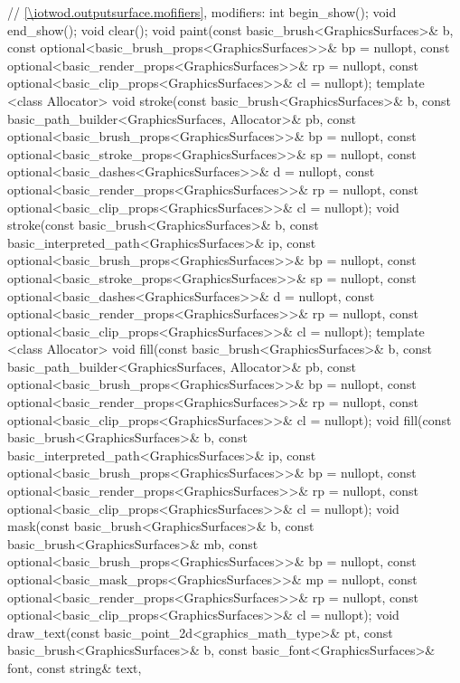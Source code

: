 \begin{codeblock}
{{    // \ref{\iotwod.outputsurface.mofifiers}, modifiers:
    int begin_show();
    void end_show();
    void clear();
    void paint(const basic_brush<GraphicsSurfaces>& b,
      const optional<basic_brush_props<GraphicsSurfaces>>& bp = nullopt,
      const optional<basic_render_props<GraphicsSurfaces>>& rp = nullopt,
      const optional<basic_clip_props<GraphicsSurfaces>>& cl = nullopt);
    template <class Allocator>
    void stroke(const basic_brush<GraphicsSurfaces>& b,
      const basic_path_builder<GraphicsSurfaces, Allocator>& pb,
      const optional<basic_brush_props<GraphicsSurfaces>>& bp = nullopt,
      const optional<basic_stroke_props<GraphicsSurfaces>>& sp = nullopt,
      const optional<basic_dashes<GraphicsSurfaces>>& d = nullopt,
      const optional<basic_render_props<GraphicsSurfaces>>& rp = nullopt,
      const optional<basic_clip_props<GraphicsSurfaces>>& cl = nullopt);
    void stroke(const basic_brush<GraphicsSurfaces>& b,
      const basic_interpreted_path<GraphicsSurfaces>& ip,
      const optional<basic_brush_props<GraphicsSurfaces>>& bp = nullopt,
      const optional<basic_stroke_props<GraphicsSurfaces>>& sp = nullopt,
      const optional<basic_dashes<GraphicsSurfaces>>& d = nullopt,
      const optional<basic_render_props<GraphicsSurfaces>>& rp = nullopt,
      const optional<basic_clip_props<GraphicsSurfaces>>& cl = nullopt);
    template <class Allocator>
    void fill(const basic_brush<GraphicsSurfaces>& b,
      const basic_path_builder<GraphicsSurfaces, Allocator>& pb,
      const optional<basic_brush_props<GraphicsSurfaces>>& bp = nullopt,
      const optional<basic_render_props<GraphicsSurfaces>>& rp = nullopt,
      const optional<basic_clip_props<GraphicsSurfaces>>& cl = nullopt);
    void fill(const basic_brush<GraphicsSurfaces>& b,
      const basic_interpreted_path<GraphicsSurfaces>& ip,
      const optional<basic_brush_props<GraphicsSurfaces>>& bp = nullopt,
      const optional<basic_render_props<GraphicsSurfaces>>& rp = nullopt,
      const optional<basic_clip_props<GraphicsSurfaces>>& cl = nullopt);
    void mask(const basic_brush<GraphicsSurfaces>& b,
      const basic_brush<GraphicsSurfaces>& mb,
      const optional<basic_brush_props<GraphicsSurfaces>>& bp = nullopt,
      const optional<basic_mask_props<GraphicsSurfaces>>& mp = nullopt,
      const optional<basic_render_props<GraphicsSurfaces>>& rp = nullopt,
      const optional<basic_clip_props<GraphicsSurfaces>>& cl = nullopt);
    void draw_text(const basic_point_2d<graphics_math_type>& pt,
      const basic_brush<GraphicsSurfaces>& b,
      const basic_font<GraphicsSurfaces>& font, const string& text,
}}
\end{codeblock}
